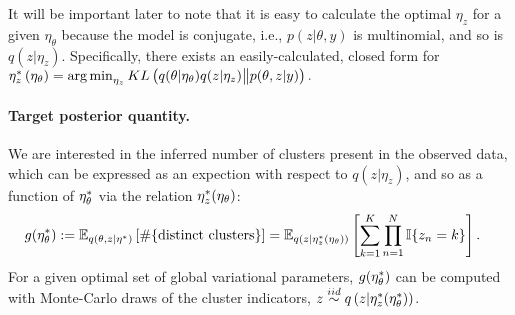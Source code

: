 It will be important later to note that it is easy to calculate
the optimal $\eta_z$ for a given $\eta_\theta$ because the model is
conjugate, i.e., $p\left(z \vert \theta, y\right)$ is multinomial,
and so is $q\left(z \vert \eta_z\right)$.  Specifically, there
exists an easily-calculated, closed form for
%
$
\eta_z^{*}\left(\eta_\theta\right) = \operatorname*{arg\,min}_{\eta_z}
    KL\left(
    q(\theta \vert \eta_\theta) q( z \vert \eta_z)
        \big\| p(\theta, z | y)
    \right).
$
%



\paragraph{Target posterior quantity.}

We are interested in the inferred number of clusters present in the observed
data, which can be expressed as an expection with respect to
$q\left(z \vert \eta_z \right)$, and so as a function of
$\eta_\theta^{*}$ via the relation $\eta_z^{*}(\eta_\theta)$:
%
\begin{align}
g(\eta_\theta^{*}) &:=
\mathbb{E}_{q(\theta, z \vert \eta^{*})} \left[ \#\{\text{distinct clusters}\} \right]  =
\mathbb{E}_{q(z \vert \eta_z^{*}(\eta_\theta))} \left[
    \sum_{k=1}^K \prod_{n=1}^N \mathbb{I}\{z_n = k\} \right].
    \label{eq:expected_num_clusters}
\end{align}
%
For a given optimal set of global variational parameters,
$g(\eta_\theta^{*})$ can be computed with Monte-Carlo draws of the cluster
indicators,
$z \stackrel{iid}{\sim} q\left(z \vert \eta_z^{*}(\eta_\theta^{*})\right)$.

%
%
